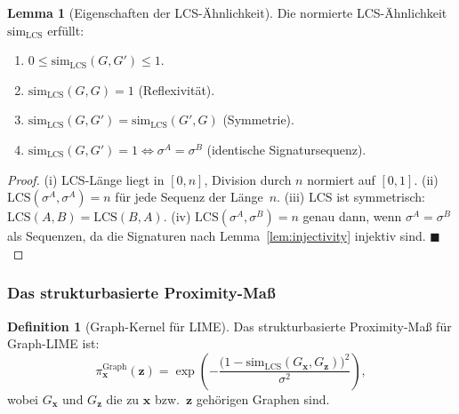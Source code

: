 ﻿\documentclass[a4paper,12pt]{article}
\theoremstyle{definition}
\newtheorem{definition}{Definition}[section]
\newtheorem{lemma}{Lemma}[section]
\begin{document}
\begin{lemma}[Eigenschaften der LCS-Ähnlichkeit]
  Die normierte LCS-Ähnlichkeit $\mathrm{sim}_{\mathrm{LCS}}$ erfüllt:
  \begin{enumerate}
    \item $0 \leq \mathrm{sim}_{\mathrm{LCS}}(G, G') \leq 1$.
    \item $\mathrm{sim}_{\mathrm{LCS}}(G, G) = 1$ (Reflexivität).
    \item $\mathrm{sim}_{\mathrm{LCS}}(G, G') = \mathrm{sim}_{\mathrm{LCS}}(G', G)$ (Symmetrie).
    \item $\mathrm{sim}_{\mathrm{LCS}}(G, G') = 1 \Leftrightarrow \sigma^A = \sigma^B$
          (identische Signatursequenz).
  \end{enumerate}
\end{lemma}

\begin{proof}
  (i) LCS-Länge liegt in $[0, n]$, Division durch $n$ normiert auf $[0, 1]$.
  (ii) $\mathrm{LCS}(\sigma^A, \sigma^A) = n$ für jede Sequenz der Länge~$n$.
  (iii) LCS ist symmetrisch: $\mathrm{LCS}(A, B) = \mathrm{LCS}(B, A)$.
  (iv) $\mathrm{LCS}(\sigma^A, \sigma^B) = n$ genau dann, wenn $\sigma^A = \sigma^B$
       als Sequenzen, da die Signaturen nach Lemma~\ref{lem:injectivity} injektiv
       sind. \hfill$\blacksquare$
\end{proof}

\subsubsection{Das strukturbasierte Proximity-Maß}

\begin{definition}[Graph-Kernel für LIME]
  Das strukturbasierte Proximity-Maß für Graph-LIME ist:
  \begin{equation}
    \pi_\mathbf{x}^{\mathrm{Graph}}(\mathbf{z})
    = \exp\!\left(-\frac{\bigl(1 - \mathrm{sim}_{\mathrm{LCS}}(G_\mathbf{x}, G_\mathbf{z})\bigr)^2}{\sigma^2}\right),
    \label{eq:graph_kernel}
  \end{equation}
  wobei $G_\mathbf{x}$ und $G_\mathbf{z}$ die zu $\mathbf{x}$ bzw.\ $\mathbf{z}$
  gehörigen Graphen sind.
\end{definition}
\end{document}
